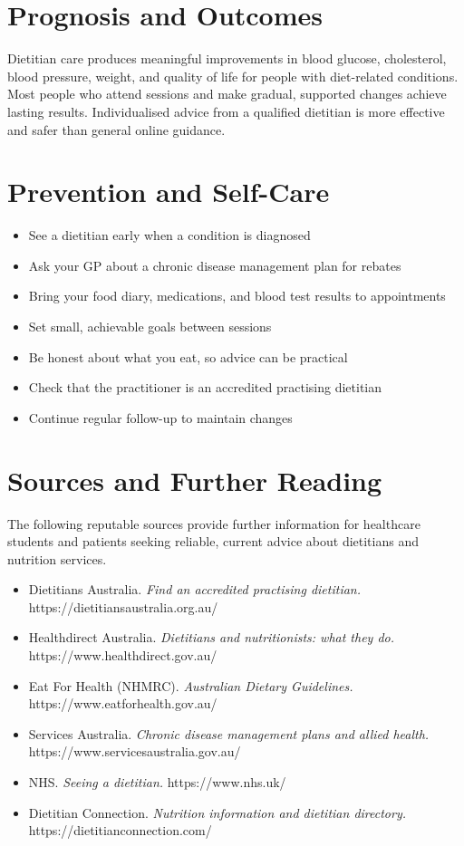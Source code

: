 \section*{Prognosis and Outcomes}
Dietitian care produces meaningful improvements in blood glucose, cholesterol, blood pressure, weight, and quality of life for people with diet-related conditions. Most people who attend sessions and make gradual, supported changes achieve lasting results. Individualised advice from a qualified dietitian is more effective and safer than general online guidance.

\section*{Prevention and Self-Care}
\begin{itemize}
    \item See a dietitian early when a condition is diagnosed
    \item Ask your GP about a chronic disease management plan for rebates
    \item Bring your food diary, medications, and blood test results to appointments
    \item Set small, achievable goals between sessions
    \item Be honest about what you eat, so advice can be practical
    \item Check that the practitioner is an accredited practising dietitian
    \item Continue regular follow-up to maintain changes
\end{itemize}

\section*{Sources and Further Reading}
The following reputable sources provide further information for healthcare students and patients seeking reliable, current advice about dietitians and nutrition services.

\begin{itemize}
    \item Dietitians Australia. \textit{Find an accredited practising dietitian.} https://dietitiansaustralia.org.au/
    \item Healthdirect Australia. \textit{Dietitians and nutritionists: what they do.} https://www.healthdirect.gov.au/
    \item Eat For Health (NHMRC). \textit{Australian Dietary Guidelines.} https://www.eatforhealth.gov.au/
    \item Services Australia. \textit{Chronic disease management plans and allied health.} https://www.servicesaustralia.gov.au/
    \item NHS. \textit{Seeing a dietitian.} https://www.nhs.uk/
    \item Dietitian Connection. \textit{Nutrition information and dietitian directory.} https://dietitianconnection.com/
\end{itemize}

